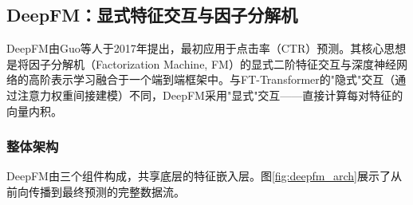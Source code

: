 
\subsection{DeepFM：显式特征交互与因子分解机}

DeepFM由Guo等人\cite{guo2017deepfm}于2017年提出，最初应用于点击率（CTR）预测。其核心思想是将因子分解机（Factorization Machine, FM）的显式二阶特征交互与深度神经网络的高阶表示学习融合于一个端到端框架中。与FT-Transformer的"隐式"交互（通过注意力权重间接建模）不同，DeepFM采用"显式"交互——直接计算每对特征的向量内积。

\subsubsection{整体架构}

DeepFM由三个组件构成，共享底层的特征嵌入层。图\ref{fig:deepfm_arch}展示了从前向传播到最终预测的完整数据流。

